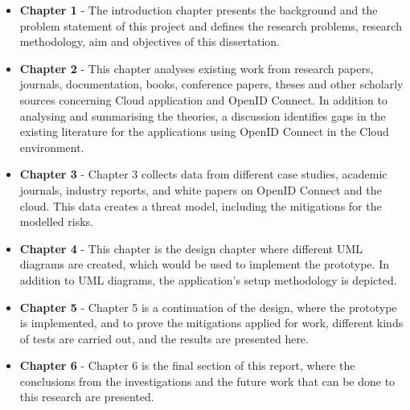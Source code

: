 \begin{itemize}
    \item \textbf{Chapter 1} - The introduction chapter presents the background and the problem statement of this project and defines the research problems, research methodology, aim and objectives of this dissertation.

    \item \textbf{Chapter 2} - This chapter analyses existing work from research papers, journals, documentation, books, conference papers, theses and other scholarly sources concerning Cloud application and OpenID Connect. In addition to analysing and summarising the theories, a discussion identifies gaps in the existing literature for the applications using OpenID Connect in the Cloud environment.

    \item \textbf{Chapter 3} - Chapter 3 collects data from different case studies, academic journals, industry reports, and white papers on OpenID Connect and the cloud. This data creates a threat model, including the mitigations for the modelled risks. 
    
    \item \textbf{Chapter 4} - This chapter is the design chapter where different UML diagrams are created, which would be used to implement the prototype. In addition to UML diagrams, the application's setup methodology is depicted.
    
    \item \textbf{Chapter 5} - Chapter 5 is a continuation of the design, where the prototype is implemented, and to prove the mitigations applied for work, different kinds of tests are carried out, and the results are presented here.
    
    \item \textbf{Chapter 6} - Chapter 6 is the final section of this report, where the conclusions from the investigations and the future work that can be done to this research are presented.

\end{itemize}